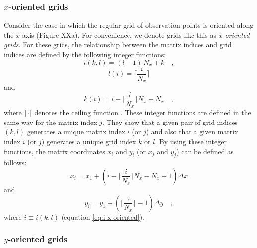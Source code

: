 \documentclass[manuscript,revised]{geophysics}
\begin{document}
\subsubsection{$x$-oriented grids}

Consider the case in which the regular grid of observation points is oriented along the
$x$-axis (Figure XXa). For convenience, we denote grids like this as $x$-\textit{oriented grids}.
For these grids, the relationship between the matrix indices and grid indices are defined
by the following integer functions:
\begin{equation}
i(k, l) = (l - 1) \, N_{x} + k \quad ,
\label{eq:i-x-oriented}
\end{equation}
\begin{equation}
l(i) = \Bigg\lceil \frac{i}{N_{x}} \Bigg\rceil
\label{eq:l-x-oriented}
\end{equation}
and
\begin{equation}
k(i)  = i - \Bigg\lceil \frac{i}{N_{x}} \Bigg\rceil N_{x} - N_{x} \quad ,
\label{eq:k-x-oriented}
\end{equation}
where $\lceil \cdot \rceil$ denotes the ceiling function \citep[][ p. 67]{graham-etal1994}.
These integer functions are defined in the same way for the matrix index $j$.
They show that a given pair of grid indices $(k, l)$ generates a unique matrix index $i$ (or $j$)
and also that a given matrix index $i$ (or $j$) generates a unique grid index $k$ or $l$.
By using these integer functions, the matrix coordinates $x_{i}$ and $y_{i}$ (or $x_{j}$ and $y_{j}$)
can be defined as follows:
\begin{equation}
x_{i} = x_{1} + \left( i - \Bigg\lceil \frac{i}{N_{x}} \Bigg\rceil N_{x} - 
N_{x} - 1 \right) \Delta x
\label{eq:xi-x-oriented}
\end{equation}
and
\begin{equation}
y_{i} = y_{1} + \left( \Bigg\lceil \frac{i}{N_{x}} \Bigg\rceil - 1 \right)
\Delta y \quad ,
\label{eq:yi-x-oriented}
\end{equation}
where $i \equiv i(k, l)$ (equation \ref{eq:i-x-oriented}).

\subsubsection{$y$-oriented grids}
\end{document}
